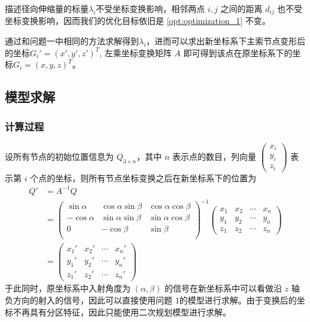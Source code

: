 \documentclass[withoutpreface,bwprint,fontset=macnew]{cumcmthesis} %
\begin{document}
		描述径向伸缩量的标量$\lambda_i$不受坐标变换影响，相邻两点 $i,j$ 之间的距离 $d_{ij}$ 也不受坐标变换影响，因而我们的优化目标依旧是 \ref{opt:optimization_1} 不变。
		
	
	通过和问题一中相同的方法求解得到$\lambda_i$，进而可以求出新坐标系下主索节点变形后的坐标$G_i' = (x', y', z')^T$, 左乘坐标变换矩阵 $A$ 即可得到该点在原坐标系下的坐标$G_i = (x, y, z)^T$。
	
	\subsection {模型求解}
	\subsubsection {计算过程}
		设所有节点的初始位置信息为 $Q_{3\times n}$，其中 $n$ 表示点的数目，列向量 $\begin{pmatrix}x_i\\y_i\\z_i\end{pmatrix}$ 表示第 $i$ 个点的坐标，则所有节点坐标变换之后在新坐标系下的位置为
		\begin{align*}
		Q' &= A^{-1} Q \\
		   &= \begin{pmatrix}
						    \sin\alpha & \cos\alpha\sin\beta & \cos\alpha\cos\beta \\
						    -\cos\alpha & \sin\alpha\sin\beta & \sin\alpha\cos\beta \\
						    0 & -\cos\beta & \sin\beta \\
						\end{pmatrix}^{-1}
			\begin{pmatrix}
			x_1 & x_2 & \cdots & x_n\\
			y_1 & y_2 & \cdots & y_n\\
			z_1 & z_2 & \cdots & z_n
			\end {pmatrix}\\
			&= \begin{pmatrix}
			x_1' & x_2' & \cdots & x_n'\\
			y_1' & y_2' & \cdots & y_n'\\
			z_1' & z_2' & \cdots & z_n'
			\end {pmatrix}
		\end{align*}
		于此同时，原坐标系中入射角度为 $(\alpha, \beta)$ 的信号在新坐标系中可以看做沿 $z$ 轴负方向的射入的信号，因此可以直接使用问题 1的模型进行求解。由于变换后的坐标不再具有分区特征，因此只能使用二次规划模型进行求解。
		
\end{document}
